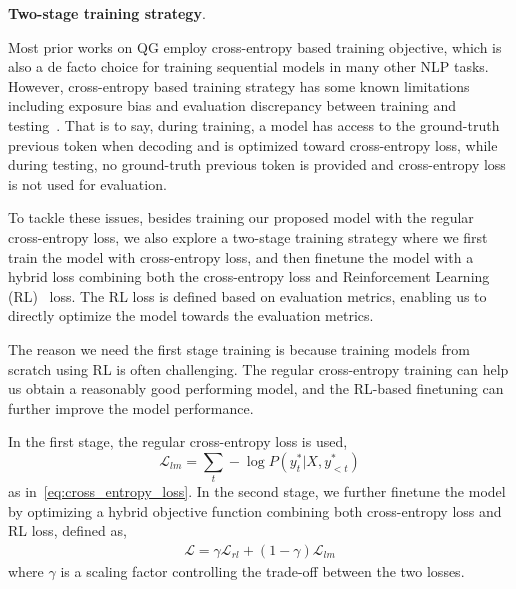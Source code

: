 \documentclass[journal]{IEEEtran}
\begin{document}
\noindent\textbf{Two-stage training strategy}.

Most prior works on QG employ cross-entropy based training objective, which is also a de facto choice for training sequential models in many other NLP tasks.
However, cross-entropy based training strategy has some known limitations including exposure bias and evaluation discrepancy between training and testing~\cite{ranzato2015sequence,wu2016google,paulus2017deep}.
That is to say, during training, a model has access to the ground-truth previous token when decoding and is optimized toward cross-entropy loss, while during testing, 
no ground-truth previous token is provided and cross-entropy loss is not used for evaluation.


To tackle these issues, besides training our proposed model with the regular cross-entropy loss, we also explore a two-stage training strategy where we first train the model with cross-entropy loss, and then finetune the model with a hybrid loss combining both the cross-entropy loss and Reinforcement Learning (RL)~\cite{williams1992simple} loss.
The RL loss is defined based on evaluation metrics, enabling us to directly optimize the model towards the evaluation metrics.

The reason we need the first stage training is because training models from scratch using RL is often challenging. The regular cross-entropy training can help us obtain a reasonably good performing model, and the RL-based finetuning can further improve the model performance.


In the first stage, the regular cross-entropy loss is used,
\begin{equation}
\mathcal{L}_{lm} = \sum_{t}{}-\log{} P(y_t^*|X, y^*_{<t})
\end{equation}
as in~\cref{eq:cross_entropy_loss}. 
In the second stage, we further finetune the model by optimizing a hybrid objective function combining both cross-entropy loss and RL loss, defined as,
\begin{equation}\label{eq:mixed_loss}
\begin{aligned}
\mathcal{L}= \gamma \mathcal{L}_{rl} + (1 - \gamma) \mathcal{L}_{lm}
\end{aligned}
\end{equation}
where $\gamma$ is a scaling factor controlling the trade-off between the two losses.
\end{document}
